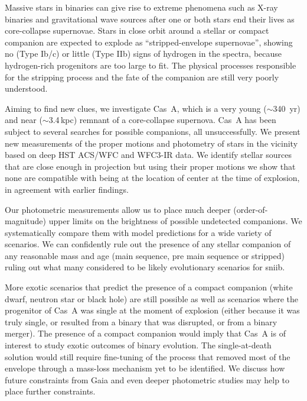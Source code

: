 \documentclass{aa}
\begin{document}
  \abstract
   {
   Massive stars in binaries can give rise to extreme phenomena such as X-ray binaries and gravitational wave sources after one or both stars end their lives as core-collapse supernovae. Stars in close orbit around a stellar or compact companion are expected to explode as ``stripped-envelope supernovae'', showing no (Type Ib/c) or little (Type IIb) signs of hydrogen in the spectra, because hydrogen-rich progenitors are too large to fit. The physical processes responsible for the stripping process and the fate of the companion are still very poorly understood.

Aiming to find new clues, we investigate Cas~A, which is a very young ($\sim$340 \,yr) and near ($\sim$3.4\,kpc) remnant of a core-collapse supernova. Cas~A has been subject to several searches for possible companions, all unsuccessfully. We present new measurements of the proper motions and photometry of stars in the vicinity based on deep HST ACS/WFC and WFC3-IR data. We identify stellar sources that are close enough in projection but using their proper motions we show that none are compatible with being at the location of center at the time of explosion, in agreement with earlier findings.

Our photometric measurements allow us to place much deeper (order-of-magnitude) upper limits on the brightness of possible undetected companions. We systematically compare them with model predictions for a wide variety of scenarios. We can confidently rule out the presence of any stellar companion of any reasonable mass and age (main sequence, pre main sequence or stripped) ruling out what many considered to be likely evolutionary scenarios for \gls{sniib}.

More exotic scenarios that predict the presence of a compact companion (white dwarf, neutron star or black hole) are still possible as well as scenarios where the progenitor of Cas~A was single at the moment of explosion (either because it was truly single, or resulted from a binary that was disrupted, or from a binary merger). The presence of a compact companion would imply that Cas~A is of interest to study exotic outcomes of binary evolution. The single-at-death solution would still require fine-tuning of the process that removed most of the envelope through a mass-loss mechanism yet to be identified. We discuss how future constraints from Gaia and even deeper photometric studies may help to place further constraints.


}

\maketitle
%
\end{document}
